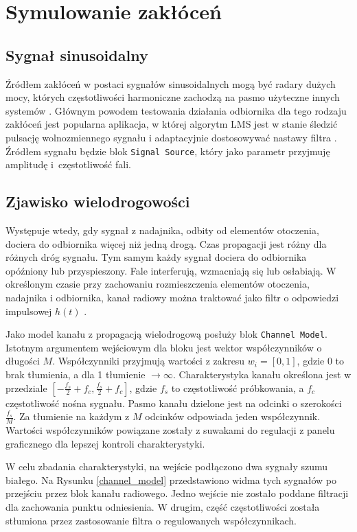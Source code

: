 \section{Symulowanie zakłóceń}
\subsection{Sygnał sinusoidalny}
Źródłem zakłóceń w postaci sygnałów sinusoidalnych mogą być radary dużych mocy, których częstotliwości harmoniczne zachodzą na pasmo użyteczne innych systemów \cite{Haykin:2004:MWC:984217}.
Głównym powodem testowania działania odbiornika dla tego rodzaju zakłóceń jest popularna aplikacja, w której algorytm LMS jest w stanie śledzić pulsację wolnozmiennego sygnału i adaptacyjnie dostosowywać nastawy filtra \cite{Haykin:1996:AFT:230061}.
Źródłem sygnału będzie blok \texttt{Signal Source}, który jako parametr przyjmuję amplitudę i~częstotliwość fali. 

\subsection{Zjawisko wielodrogowości}
Występuje wtedy, gdy sygnał z nadajnika, odbity od elementów otoczenia, dociera do odbiornika więcej niż jedną drogą. 
Czas propagacji jest różny dla różnych dróg sygnału. 
Tym samym każdy sygnał dociera do odbiornika opóźniony lub przyspieszony. 
Fale interferują, wzmacniają się lub osłabiają. 
W określonym czasie przy zachowaniu rozmieszczenia elementów otoczenia, nadajnika i odbiornika, kanał radiowy można traktować jako filtr o odpowiedzi impulsowej $h(t)$ \cite{Haykin:2004:MWC:984217}. 

Jako model kanału z propagacją wielodrogową posłuży blok \texttt{Channel Model}. 
Istotnym argumentem wejściowym dla bloku jest wektor współczynników o długości $M$. 
Współczynniki przyjmują wartości z zakresu $w_i = [0,1]$, gdzie 0 to brak tłumienia, a dla 1 tłumienie $\to \infty$. 
Charakterystyka kanału określona jest w przedziale $[-\frac{f_s}{2} + f_c,\frac{f_s}{2} + f_c]$, gdzie $f_s$ to częstotliwość próbkowania, a $f_c$ częstotliwość nośna sygnału. 
Pasmo kanału dzielone jest na odcinki o szerokości $\frac{f_s}{M}$. 
Za tłumienie na każdym z $M$ odcinków odpowiada jeden współczynnik.
Wartości współczynników powiązane zostały z suwakami do regulacji z panelu graficznego dla lepszej kontroli charakterystyki.

W celu zbadania charakterystyki, na wejście podłączono dwa sygnały szumu białego. 
Na Rysunku \ref{channel_model} przedstawiono widma tych sygnałów po przejściu przez blok kanału radiowego. 
Jedno wejście nie zostało poddane filtracji dla zachowania punktu odniesienia. 
W drugim, część częstotliwości została stłumiona przez zastosowanie filtra o regulowanych współczynnikach.

